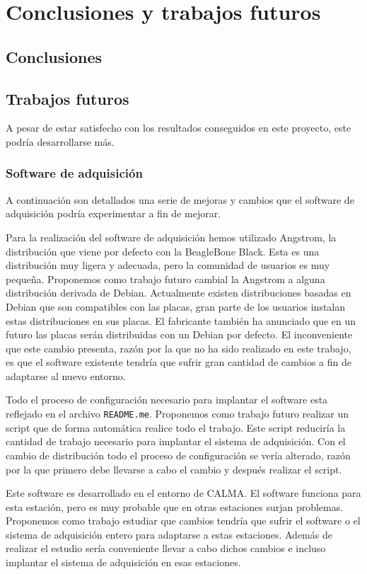 \chapter{Conclusiones y trabajos futuros}
\label{cap_conclusiones}


\section{Conclusiones}

\section{Trabajos futuros}
	A pesar de estar satisfecho con los resultados conseguidos en este proyecto, este podría desarrollarse más.
	\subsection{Software de adquisición}
		A continuación son detallados una serie de mejoras y cambios que el software de adquisición podría experimentar a fin de mejorar.
		\begin{description}[style=unboxed,leftmargin=0cm,labelwidth=1cm]
			\item[Debian]
				Para la realización del software de adquisición hemos utilizado Angstrom, la distribución que viene por defecto con la
				BeagleBone Black. Esta es una distribución muy ligera y adecuada, pero la comunidad de usuarios es muy pequeña.
				Proponemos como trabajo futuro cambial la Angstrom a alguna distribución derivada de Debian. Actualmente existen
				distribuciones basadas en Debian que son compatibles con las placas, gran parte de los usuarios instalan estas
				distribuciones en sus placas. El fabricante también ha anunciado que en un futuro las placas serán distribuidas con un
				Debian por defecto. El inconveniente que este cambio presenta, razón por la que no ha sido realizado en este trabajo,
				es que el software existente tendría que sufrir gran cantidad de cambios a fin de adaptarse al nuevo entorno.
			\item[Script de configuración]
				Todo el proceso de configuración necesario para implantar el software esta reflejado en el archivo \texttt{README.me}.
				Proponemos como trabajo futuro realizar un script que de forma automática realice todo el trabajo. Este script
				reduciría la cantidad de trabajo necesario para implantar el sistema de adquisición. Con el cambio de distribución
				todo el proceso de configuración se vería alterado, razón por la que primero debe llevarse a cabo el cambio y después
				realizar el script.
			\item[Adaptación para otras estaciones]
				Este software es desarrollado en el entorno de CALMA. El software funciona para esta estación, pero es muy probable
				que en otras estaciones surjan problemas. Proponemos como trabajo estudiar que cambios tendría que sufrir el software
				o el sistema de adquisición entero para adaptarse a estas estaciones. Además de realizar el estudio sería conveniente
				llevar a cabo dichos cambios e incluso implantar el sistema de adquisición en esas estaciones.   
		\end{description}
